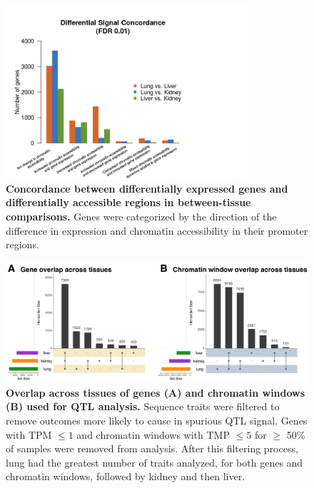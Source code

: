 \documentclass[9pt,twocolumn,twoside]{gsajnl}
\begin{document}
\clearpage

\begin{figure}[hp]
\renewcommand{\familydefault}{\sfdefault}\normalfont
\centering
\includegraphics[width=0.8\textwidth, trim={0in 0in 0in 0in}, clip]{figs/diff_concordance.png}
\caption{\textbf{Concordance between differentially expressed genes and differentially accessible regions in between-tissue comparisons.} 
Genes were categorized by the direction of the difference in expression and chromatin accessibility in their promoter regions.\label{fig:diff_concordance}}
\end{figure}

\begin{figure}[hp]
\renewcommand{\familydefault}{\sfdefault}\normalfont
\centering
\includegraphics[width=\textwidth, trim={0in 0in 0in 0in}, clip]{figs/upset_genes_chromatin.pdf}
\caption{\textbf{Overlap across tissues of genes (A) and chromatin windows (B) used for QTL analysis.} 
Sequence traits were filtered to remove outcomes more likely to cause in spurious QTL signal. Genes with TPM $\le 1$ and chromatin windows with TMP $\le 5$ for $\ge$ 50\% of samples were removed from analysis. After this filtering process, lung had the greatest number of traits analyzed, for both genes and chromatin windows, followed by kidney and then liver. 
\label{fig:upset_genes_chromatin}}
\end{figure}
\end{document}
